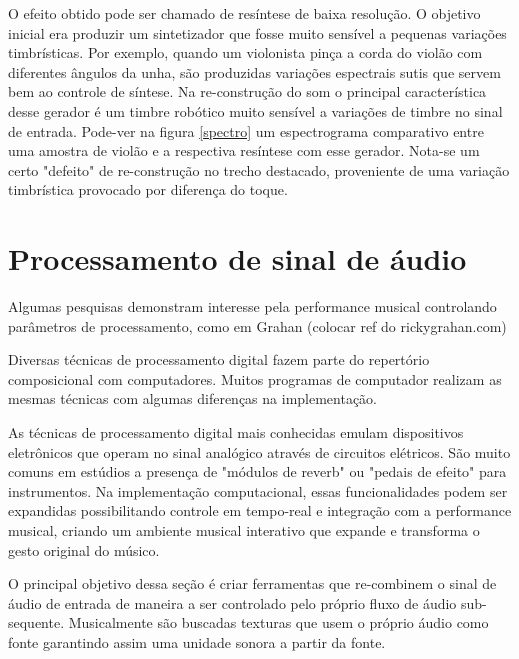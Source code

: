 \documentclass{ppgmus}
\begin{document}
O efeito obtido pode ser chamado de resíntese de baixa resolução. O objetivo
inicial era produzir um sintetizador que fosse muito sensível a pequenas
variações timbrísticas. Por exemplo, quando um violonista pinça a corda do violão
com diferentes ângulos da unha, são produzidas variações espectrais sutis que servem
bem ao controle de síntese. Na re-construção do som o principal característica desse
gerador é um timbre robótico muito sensível a variações de timbre no sinal de entrada.
Pode-ver na figura \ref{spectro} um espectrograma comparativo entre uma amostra
de violão e a respectiva resíntese com esse gerador. Nota-se um certo "defeito"
de re-construção no trecho destacado, proveniente de uma variação timbrística provocado
por diferença do toque. 




\pagebreak

\section{Processamento de sinal de áudio}


Algumas pesquisas demonstram interesse pela 
performance musical controlando parâmetros de processamento, como
em Grahan (colocar ref do rickygrahan.com)



Diversas técnicas de processamento digital fazem parte do repertório
composicional com computadores. Muitos programas de computador realizam
as mesmas técnicas com algumas diferenças na implementação.

As técnicas de processamento digital mais conhecidas emulam dispositivos
eletrônicos que operam no sinal analógico através de circuitos elétricos.
São muito comuns em estúdios a presença de "módulos de reverb" ou 
"pedais de efeito" para instrumentos. Na implementação computacional,
essas funcionalidades podem ser expandidas possibilitando controle em
tempo-real e integração com a performance musical, criando um ambiente
musical interativo que expande e transforma o gesto original do músico.

O principal objetivo dessa seção é criar ferramentas que re-combinem
o sinal de áudio de entrada de maneira a ser controlado pelo próprio
fluxo de áudio sub-sequente. Musicalmente são buscadas texturas que usem
o próprio áudio como fonte garantindo assim uma unidade sonora a partir da fonte.
\end{document}

